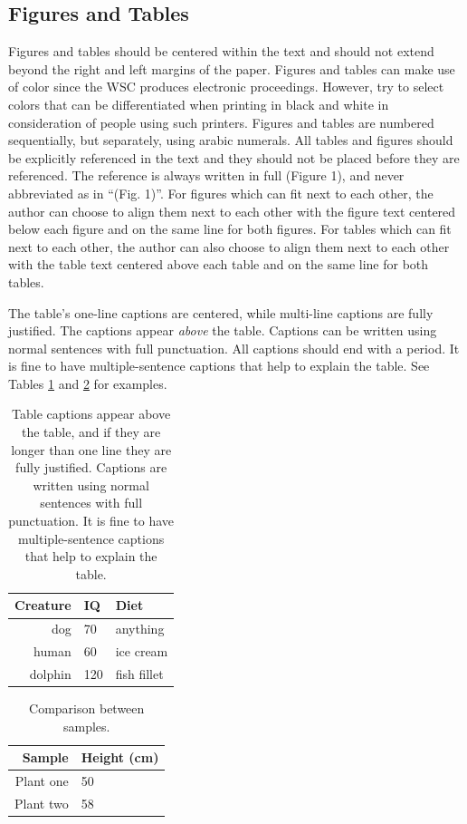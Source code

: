 \documentclass{wscpaperproc}
\theoremstyle{wsc}
\begin{document}
\subsection{Figures and Tables}
\label{sec:graphics}
Figures and tables should be centered within the text and should not extend beyond the right and left margins of the paper.
Figures and tables can make use of color since the WSC produces electronic proceedings.
However, try to select colors that can be differentiated when printing in black and white in consideration of people using such printers. Figures and tables are numbered sequentially, but separately, using arabic numerals. 
All tables and figures should be explicitly referenced in the text and they should not be placed before they are referenced. 
The reference is always written in full (Figure 1), and never abbreviated as in ``(Fig. 1)''.
For figures which can fit next to each other, the author can choose to align them next to each other with the figure text centered below each figure and on the same line for both figures. For tables which can fit next to each other, the author can also choose to align them next to each other with the table text centered above each table and on the same line for both tables. 

The table's one-line captions are centered, while multi-line captions are fully justified.
The captions appear {\em above} the table. 
Captions can be written using normal sentences with full punctuation. All captions should end with a period. It is fine to have multiple-sentence captions that help to explain the table. 
See Tables \ref{tab: first} and \ref{tab: second} for examples.

\begin{table}[htb]
\centering
\caption{Table captions appear above the table, and if they are longer than one line they are fully justified. Captions are written using normal sentences with full punctuation. It is fine to have multiple-sentence captions that help to explain the table.\label{tab: first}}
\begin{tabular}{rll}
\hline
Creature & IQ & Diet\\ \hline
dog & 70 & anything\\
human & 60 & ice cream \\
dolphin & 120 & fish fillet\\
\hline
\end{tabular}
\end{table}

\begin{table}[htb]
\centering
\caption{Comparison between samples.\label{tab: second}}
\begin{tabular}{|r|l|}
\hline
Sample & Height (cm) \\ \hline
Plant one & 50 \\ \hline
Plant two & 58 \\
\hline
\end{tabular}
\end{table}
 
\end{document}
